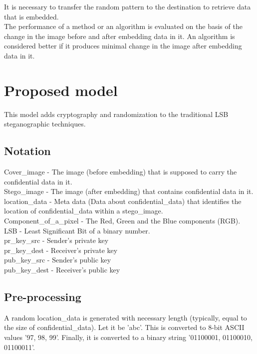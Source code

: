 \documentclass[conference]{IEEEtran}
\begin{document}
It is necessary to transfer the random pattern to the destination to retrieve data that is embedded. \\


The performance of a method or an algorithm is evaluated on the basis of the change in the image before and after embedding data in it.
An algorithm is considered better if it produces minimal change in the image after embedding data in it.\\

\section{Proposed model}
This model adds cryptography and randomization to the traditional LSB steganographic techniques.

\subsection{Notation}
Cover\_image - The image (before embedding) that is supposed to carry the confidential data in it. \\

Stego\_image - The image (after embedding) that contains confidential data in it. \\

location\_data - Meta data (Data about confidential\_data) that identifies the location of confidential\_data within a stego\_image. \\

Component\_of\_a\_pixel - The Red, Green and the Blue components (RGB). \\

LSB - Least Significant Bit of a binary number. \\

pr\_key\_src - Sender's private key \\

pr\_key\_dest - Receiver's private key \\

pub\_key\_src - Sender's public key \\

pub\_key\_dest - Receiver's public key \\

\subsection{Pre-processing}
A random location\_data is generated with necessary length (typically, equal to the size of confidential\_data). Let it be 'abc'.
This is converted to 8-bit ASCII values '97, 98, 99'.
Finally, it is converted to a binary string '01100001, 01100010, 01100011'.\\
\end{document}

